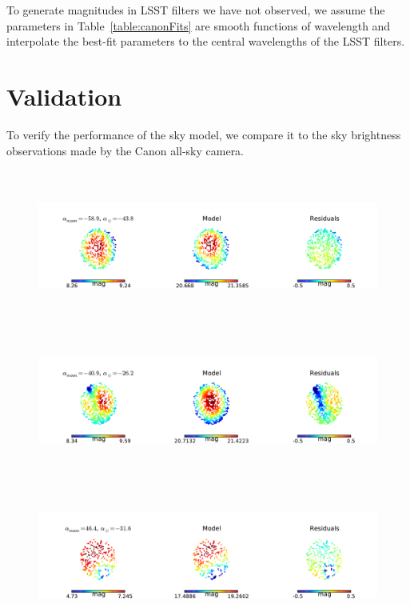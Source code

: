 \documentclass[]{spie}
\begin{document}
To generate magnitudes in LSST filters we have not observed, we assume the parameters in Table~\ref{table:canonFits} are smooth functions of wavelength and interpolate the best-fit parameters to the central wavelengths of the LSST filters.


\section{Validation}\label{sec:validate}

To verify the performance of the sky model, we compare it to the sky brightness observations made by the Canon all-sky camera.

\begin{figure}[ht]
  \begin{center}
  \includegraphics[height=5cm]{plots/exampleSkys_0.pdf} \\
  \includegraphics[height=5cm]{plots/exampleSkys_1.pdf} \\
  \includegraphics[height=5cm]{plots/exampleSkys_2.pdf} \\

\end{center}
\end{figure}
\end{document}
